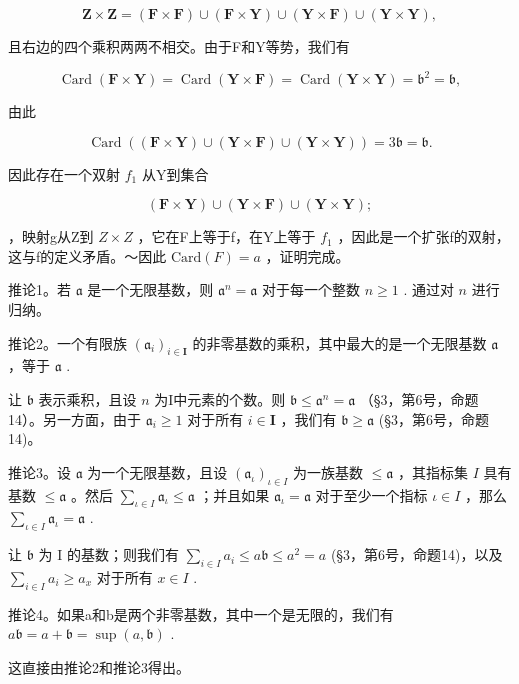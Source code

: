 \[
\mathbf {Z} \times \mathbf {Z} = (\mathbf {F} \times \mathbf {F}) \cup (\mathbf {F} \times \mathbf {Y}) \cup (\mathbf {Y} \times \mathbf {F}) \cup (\mathbf {Y} \times \mathbf {Y}),
\]

且右边的四个乘积两两不相交。由于F和Y等势，我们有

\[
\operatorname{Card} (\mathbf {F} \times \mathbf {Y}) = \operatorname{Card} (\mathbf {Y} \times \mathbf {F}) = \operatorname{Card} (\mathbf {Y} \times \mathbf {Y}) = \mathfrak {b} ^ {2} = \mathfrak {b},
\]

由此

\[
\operatorname{Card} ((\mathbf {F} \times \mathbf {Y}) \cup (\mathbf {Y} \times \mathbf {F}) \cup (\mathbf {Y} \times \mathbf {Y})) = 3 \mathfrak {b} = \mathfrak {b}.
\]

因此存在一个双射 \(f_{1}\) 从Y到集合

\[
(\mathbf {F} \times \mathbf {Y}) \cup (\mathbf {Y} \times \mathbf {F}) \cup (\mathbf {Y} \times \mathbf {Y});
\]

，映射g从Z到 \(Z \times Z\) ，它在F上等于f，在Y上等于 \(f_{1}\) ，因此是一个扩张f的双射，这与f的定义矛盾。～因此 \(\text{Card}(F) = a\) ，证明完成。

推论1。若 \(\mathfrak{a}\) 是一个无限基数，则 \(\mathfrak{a}^n = \mathfrak{a}\) 对于每一个整数 \(n \geqslant 1\) . 通过对 \(n\) 进行归纳。

推论2。一个有限族 \((\mathfrak{a}_i)_{i\in \mathbf{I}}\) 的非零基数的乘积，其中最大的是一个无限基数 \(\mathfrak{a}\) ，等于 \(\mathfrak{a}\) .

让 \(\mathfrak{b}\) 表示乘积，且设 \(n\) 为I中元素的个数。则 \(\mathfrak{b} \leqslant \mathfrak{a}^n = \mathfrak{a}\) （§3，第6号，命题14）。另一方面，由于 \(\mathfrak{a}_i \geqslant 1\) 对于所有 \(i \in \mathbf{I}\) ，我们有 \(\mathfrak{b} \geqslant \mathfrak{a}\) (§3，第6号，命题14)。

推论3。设 \(\mathfrak{a}\) 为一个无限基数，且设 \((\mathfrak{a}_{\iota})_{\iota \in I}\) 为一族基数 \(\leqslant \mathfrak{a}\) ，其指标集 \(I\) 具有基数 \(\leqslant \mathfrak{a}\) 。然后 \(\sum_{\iota \in I} \mathfrak{a}_{\iota} \leqslant \mathfrak{a}\) ；并且如果 \(\mathfrak{a}_{\iota} = \mathfrak{a}\) 对于至少一个指标 \(\iota \in I\) ，那么 \(\sum_{\iota \in I} \mathfrak{a}_{\iota} = \mathfrak{a}\) .

让 \(\mathfrak{b}\) 为 I 的基数；则我们有 \(\sum_{i\in I}a_i\leqslant a\mathfrak{b}\leqslant a^2 = a\) (§3，第6号，命题14)，以及 \(\sum_{i\in I}a_i\geqslant a_x\) 对于所有 \(x\in I\) .

推论4。如果a和b是两个非零基数，其中一个是无限的，我们有 \(a\mathfrak{b} = a + \mathfrak{b} = \sup(a, \mathfrak{b})\) .

这直接由推论2和推论3得出。

